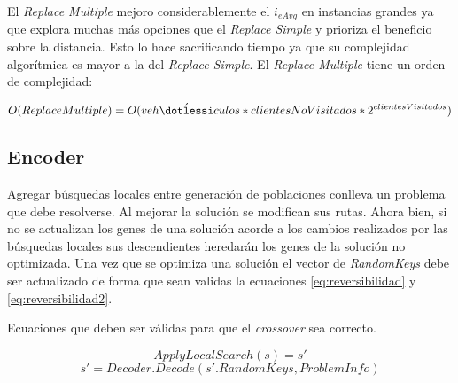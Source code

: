 \bigskip

El \textit{Replace Multiple} mejoro considerablemente el $i_{eAvg}$ en instancias grandes ya que explora muchas más opciones que el \textit{Replace Simple} y prioriza el beneficio sobre la distancia. Esto lo hace sacrificando tiempo ya que su complejidad algorítmica es mayor a la del \textit{Replace Simple}. El \textit{Replace Multiple} tiene un orden de complejidad:

\begin{equation*}
O(Replace Multiple) = O(veh\acute{\dotlessi}culos * clientesNoVisitados * 2^{clientesVisitados})
\end{equation*}


\subsection{Encoder}

Agregar búsquedas locales entre generación de poblaciones conlleva un problema que debe resolverse. Al mejorar la solución se modifican sus rutas. Ahora bien, si no se actualizan los genes de una solución acorde a los cambios realizados por las búsquedas locales sus descendientes heredarán los genes de la solución no optimizada. Una vez que se optimiza una solución el vector de \textit{RandomKeys} debe ser actualizado de forma que sean validas la ecuaciones \ref{eq:reversibilidad} y \ref{eq:reversibilidad2}.

\bigskip

\begin{mycapequ}[!ht]
	\caption{Ecuaciones que deben ser válidas para que el \textit{crossover} sea correcto.}
	\begin{equation} \label{eq:reversibilidad}
	ApplyLocalSearch(s) = s'
	\end{equation}
	\begin{equation} \label{eq:reversibilidad2}
	s' = Decoder.Decode(s'.RandomKeys, ProblemInfo)
	\end{equation}
\end{mycapequ}

\bigskip


